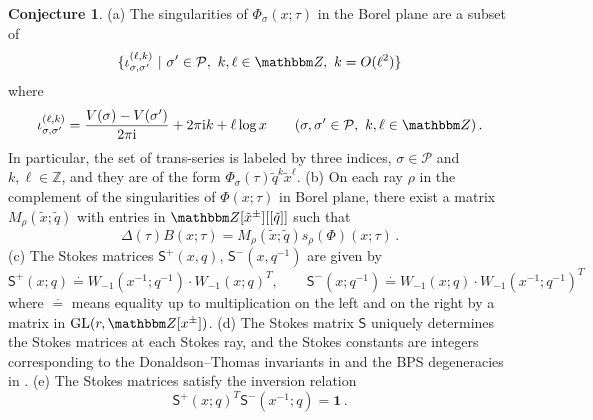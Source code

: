 \documentclass[12pt,reqno]{amsart}
\theoremstyle{definition}
\newtheorem{conjecture}[theorem]{Conjecture}
\def\BZ{\mathbbm Z}
\def\IZ{\mathbb{Z}}
\def\calP{\mathcal P}
\def\s{\sigma}
\def\GL{\mathrm{GL}}
\def\tq{\tilde{q}}
\def\tx{\tilde{x}}
\def\ri{\mathrm{i}}
\def\tx{\tilde{x}}
\def\ri{{\rm i}}
\def\md{\mathbf}
\def\ms{\mathsf}
\def\IZ{\mathbb{Z}}
\begin{document}
\begin{conjecture}
  \label{conj.asy}
  \rm{(a)} The singularities of $\Phi_{\s}(x;\tau)$ in the Borel plane
  are a subset of
  \begin{equation}
    \label{Phising}
    \{ \iota_{\s,\s'}^{(\ell,k)} \,\, |
    \,\, \s' \in \calP, \,\, k, \ell \in \BZ, \,\, k=O(\ell^2) \} 
  \end{equation}
  where
  \begin{equation}
    \label{iota}
    \iota_{\s,\s'}^{(\ell,k)} = \frac{V(\s) - V(\s')}{2\pi\ri} +
    2\pi\ri k + \ell \log x \qquad (\s,\s' \in \calP, \,\, k, \ell \in \BZ) \,.
  \end{equation}
  In particular, the set of trans-series is labeled by three indices,
  $\sigma \in \calP$ and $k, \ell \in \IZ$, and they are of the form
  $\Phi_\s(\tau) \tq^k \tx^\ell$.  \newline
  \rm{(b)} On each ray $\rho$ in the complement of the singularities
  of $\Phi(x;\tau)$ in Borel plane, there exist a matrix
  $M_\rho(\tx;\tq)$ with entries in $\BZ[\tx^{\pm}][[\tq]]$ such that
% 
  \begin{equation}
    \label{abrelx}
    \Delta(\tau) B(x;\tau) = M_\rho(\tx;\tq) s_\rho(\Phi)(x;\tau) \,. 
  \end{equation}
%
  \rm{(c)} The Stokes matrices $\ms{S}^{+}(x,q)$, $\ms{S}^{-}(x,q^{-1})$
  are given by
  \begin{equation}
  \label{2S}
  \ms{S}^{+}(x;q) \stackrel{\cdot}=
  W_{-1}(x^{-1};q^{-1})\cdot W_{-1}(x;q)^T, \qquad
  \ms{S}^{-}(x;q^{-1}) \stackrel{\cdot}= W_{-1}(x;q)\cdot W_{-1}(x^{-1};q^{-1})^T
  \end{equation}
  where $\stackrel{\cdot}=$ means equality up to multiplication on the
  left and on the right by a matrix in $\GL(r,\BZ[x^\pm])$.  \newline
  \rm{(d)} The Stokes matrix $\ms{S}$ uniquely determines the Stokes
  matrices at each Stokes ray, and the Stokes constants are integers
  corresponding to the Donaldson--Thomas invariants in
  \cite{KS,KS:wall-crossing,KS:stability} and the BPS degeneracies 
  in \cite{gmn,gmn2}.  \newline
  \rm{(e)} The Stokes matrices satisfy the inversion relation
    \begin{equation}
    \label{Ssym}
    \ms{S}^+(x;q)^T \ms{S}^-(x^{-1};q) = \md{1}\,.
  \end{equation}
\end{conjecture}
\end{document}
